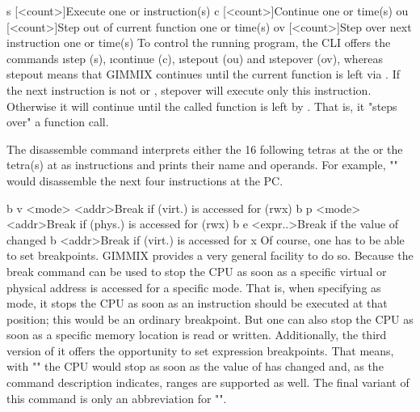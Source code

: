 \gcmdtblfour
	{s [<count>]}{Execute one or  instruction(s)}
	{c [<count>]}{Continue one or  time(s)}
	{ou [<count>]}{Step out of current function one or  time(s)}
	{ov [<count>]}{Step over next instruction one or  time(s)}
\noindent To control the running program, the CLI offers the commands \i{step} (s), \i{continue} (c), \i{stepout} (ou) and \i{stepover} (ov), whereas stepout means that GIMMIX continues until the current function is left via . If the next instruction is not  or , stepover will execute only this instruction. Otherwise it will continue until the called function is left by . That is, it "steps over" a function call.

\noindent The disassemble command interprets either the 16 following tetras at the  or the tetra(s) at  as instructions and prints their name and operands. For example, "" would disassemble the next four instructions at the \gls{PC}.

\gcmdtblfour
	{b v <mode> <addr>}{Break if  (virt.) is accessed for  (rwx)}
	{b p <mode> <addr>}{Break if  (phys.) is accessed for  (rwx)}
	{b e <expr..>}{Break if the value of  changed}
	{b <addr>}{Break if  (virt.) is accessed for x}
\noindent Of course, one has to be able to set breakpoints. GIMMIX provides a very general facility to do so. Because the break command  can be used to stop the CPU as soon as a specific virtual or physical address is accessed for a specific mode. That is, when specifying  as mode, it stops the CPU as soon as an instruction should be executed at that position; \ie this would be an ordinary breakpoint. But one can also stop the CPU as soon as a specific memory location is read or written. Additionally, the third version of it offers the opportunity to set expression breakpoints. That means, with "" the CPU would stop as soon as the value of  has changed and, as the command description indicates, ranges are supported as well. The final variant of this command is only an abbreviation for "".

